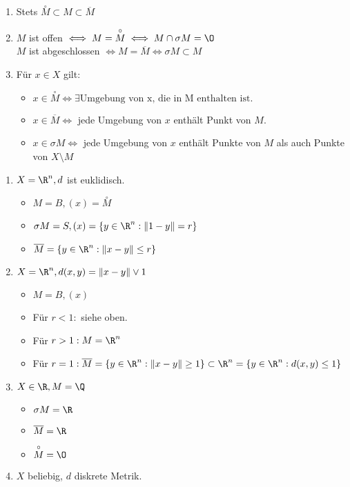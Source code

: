 \begin{remark}
\begin{enumerate}
    \item Stets $\overset{\circ}{M} \subset M \subset \overline{M}$ 
    \item $M$ ist offen $\iff M = \overset{\circ}{M} \iff M \cap \sigma M = \O$ \\
        $M$ ist abgeschlossen $\iff M = \overline{M} \iff \sigma M \subset M$
    \item Für $x \in X $ gilt:
        \begin{itemize}
            \item $x \in \overset{\circ}{M} \iff \exists \text{Umgebung von x, die in M enthalten ist.}$
            \item $x \in \overline{M} \iff $ jede Umgebung von $x$ enthält Punkt von $M$.
            \item $x \in \sigma M \iff$ jede Umgebung von $x$ enthält Punkte von $M$ als auch Punkte von $X \setminus M$  
        \end{itemize}
\end{enumerate}
\end{remark}
\begin{example}
\begin{enumerate}
    \item $X = \R^n, d $ ist euklidisch. 
        \begin{itemize}
            \item $M= B, (x) = \overset{\circ}{M}$
            \item $\sigma M = S, (x) = \{y \in \R^n : \|1-y\|= r\}$ 
            \item $\overline{M}= \{y \in \R^n : \|x-y\|\le r\}$ 
        \end{itemize}
    \item $X = \R^n, d(x,y) = \|x-y\| \vee 1$ 
\begin{itemize}
    \item $M= B, (x)$ 
    \item Für $r <1:$ siehe oben.
    \item Für $r>1: M = \R^n$
    \item Für $r=1: \overline{M}= \{y \in \R^n : \|x-y\| \ge 1\} \subset \R^n = \{y \in \R^n : d(x,y) \le 1\}  $ 
\end{itemize}
\item $X \in \R, M = \Q$ 
    \begin{itemize}
        \item $\sigma M = \R$ 
        \item $\overline{M}=\R$
        \item $\overset{\circ}{M}= \O$
    \end{itemize}
\item $X$ beliebig, $d$ diskrete Metrik.
\end{enumerate}
\end{example}
